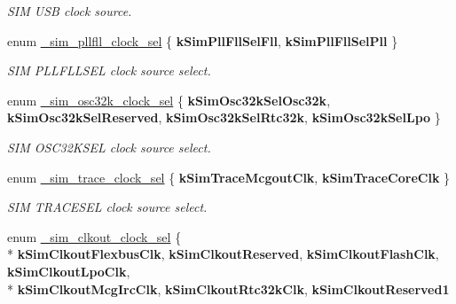 \begin{DoxyCompactItemize}
\begin{DoxyCompactList}\small\item\em S\+IM U\+SB clock source. \end{DoxyCompactList}
\item 
enum \hyperlink{group__sim__hal_gac50cdfb7351b61de041d031eb0c3bcfc}{\+\_\+sim\+\_\+pllfll\+\_\+clock\+\_\+sel} \{ {\bfseries k\+Sim\+Pll\+Fll\+Sel\+Fll}, 
{\bfseries k\+Sim\+Pll\+Fll\+Sel\+Pll}
 \}\hypertarget{group__sim__hal_gac50cdfb7351b61de041d031eb0c3bcfc}{}\label{group__sim__hal_gac50cdfb7351b61de041d031eb0c3bcfc}
\begin{DoxyCompactList}\small\item\em S\+IM P\+L\+L\+F\+L\+L\+S\+EL clock source select. \end{DoxyCompactList}
\item 
enum \hyperlink{group__sim__hal_ga53eab0504e5f90d3f35a8cdd41aff069}{\+\_\+sim\+\_\+osc32k\+\_\+clock\+\_\+sel} \{ {\bfseries k\+Sim\+Osc32k\+Sel\+Osc32k}, 
{\bfseries k\+Sim\+Osc32k\+Sel\+Reserved}, 
{\bfseries k\+Sim\+Osc32k\+Sel\+Rtc32k}, 
{\bfseries k\+Sim\+Osc32k\+Sel\+Lpo}
 \}\hypertarget{group__sim__hal_ga53eab0504e5f90d3f35a8cdd41aff069}{}\label{group__sim__hal_ga53eab0504e5f90d3f35a8cdd41aff069}
\begin{DoxyCompactList}\small\item\em S\+IM O\+S\+C32\+K\+S\+EL clock source select. \end{DoxyCompactList}
\item 
enum \hyperlink{group__sim__hal_gaadc91652066cea42d44889e57aa74bca}{\+\_\+sim\+\_\+trace\+\_\+clock\+\_\+sel} \{ {\bfseries k\+Sim\+Trace\+Mcgout\+Clk}, 
{\bfseries k\+Sim\+Trace\+Core\+Clk}
 \}\hypertarget{group__sim__hal_gaadc91652066cea42d44889e57aa74bca}{}\label{group__sim__hal_gaadc91652066cea42d44889e57aa74bca}
\begin{DoxyCompactList}\small\item\em S\+IM T\+R\+A\+C\+E\+S\+EL clock source select. \end{DoxyCompactList}
\item 
enum \hyperlink{group__sim__hal_ga10bf1258a147a8d691ef8e8afcc1b28a}{\+\_\+sim\+\_\+clkout\+\_\+clock\+\_\+sel} \{ \\*
{\bfseries k\+Sim\+Clkout\+Flexbus\+Clk}, 
{\bfseries k\+Sim\+Clkout\+Reserved}, 
{\bfseries k\+Sim\+Clkout\+Flash\+Clk}, 
{\bfseries k\+Sim\+Clkout\+Lpo\+Clk}, 
\\*
{\bfseries k\+Sim\+Clkout\+Mcg\+Irc\+Clk}, 
{\bfseries k\+Sim\+Clkout\+Rtc32k\+Clk}, 
{\bfseries k\+Sim\+Clkout\+Reserved1}

\end{DoxyCompactItemize}
